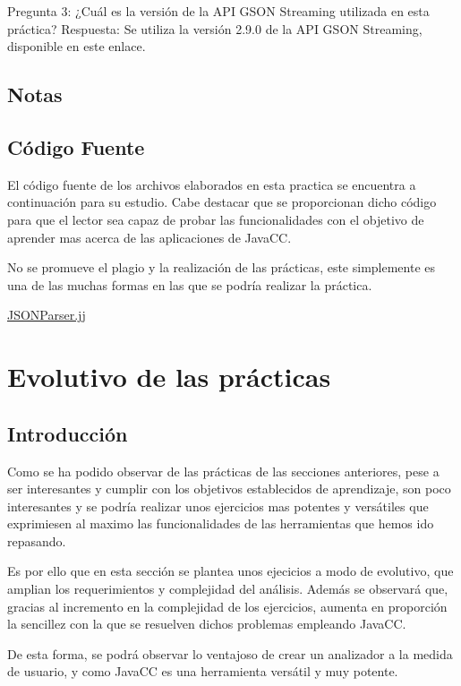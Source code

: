 Pregunta 3: ¿Cuál es la versión de la API GSON Streaming utilizada en esta práctica?
Respuesta: Se utiliza la versión 2.9.0 de la API GSON Streaming, disponible en este enlace.

\subsection{Notas}

\subsection{Código Fuente}

El código fuente de los archivos elaborados en esta practica se encuentra a continuación para su estudio. Cabe destacar que se proporcionan dicho código para que el lector sea capaz de probar las funcionalidades con el objetivo de aprender mas acerca de las aplicaciones de JavaCC.

No se promueve el plagio y la realización de las prácticas, este simplemente es una de las muchas formas en las que se podría realizar la práctica.

\hyperref[sec:JSONParser]{JSONParser.jj}

\section{Evolutivo de las prácticas}

\subsection{Introducción}

Como se ha podido observar de las prácticas de las secciones anteriores, pese a ser interesantes y cumplir con los objetivos establecidos de aprendizaje, son poco interesantes y se podría realizar unos ejercicios mas potentes y versátiles que exprimiesen al maximo las funcionalidades de las herramientas que hemos ido repasando.

Es por ello que en esta sección se plantea unos ejecicios a modo de evolutivo, que amplian los requerimientos y complejidad del análisis. Además se observará que, gracias al incremento en la complejidad de los ejercicios, aumenta en proporción la sencillez con la que se resuelven dichos problemas empleando JavaCC.

De esta forma, se podrá observar lo ventajoso de crear un analizador a la medida de usuario, y como JavaCC es una herramienta versátil y muy potente.

